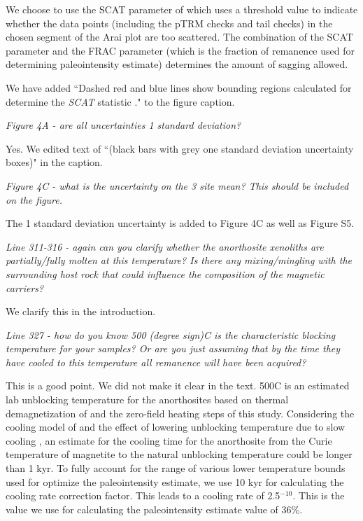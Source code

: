 \documentclass[11pt, letterpaper]{article}
\begin{document}
\begin{flushleft}
We choose to use the SCAT parameter of \cite{Tauxe2004a} which uses a threshold value to indicate whether the data points (including the pTRM checks and tail checks) in the chosen segment of the Arai plot are too scattered. The combination of the SCAT parameter and the FRAC parameter (which is the fraction of remanence used for determining paleointensity estimate) determines the amount of sagging allowed.

We have added ``Dashed red and blue lines show bounding regions calculated for determine the \textit{SCAT} statistic \cite{Shaar2013a}." to the figure caption.

\textit{Figure 4A - are all uncertainties 1 standard deviation?}

Yes. We edited text of ``(black bars with grey one standard deviation uncertainty boxes)" in the caption.

\textit{Figure 4C - what is the uncertainty on the 3 site mean? This should be included on the figure.}

The 1 standard deviation uncertainty is added to Figure 4C as well as Figure S5.

\textit{Line 311-316 - again can you clarify whether the anorthosite xenoliths are partially/fully molten at this temperature? Is there any mixing/mingling with the surrounding host rock that could influence the composition of the magnetic carriers?}

We clarify this in the introduction.  

\textit{Line 327 - how do you know 500 (degree sign)C is the characteristic blocking temperature for your samples? Or are you just assuming that by the time they have cooled to this temperature all remanence will have been acquired?}

This is a good point. We did not make it clear in the text. 500\textdegree C is an estimated lab unblocking temperature for the anorthosites based on thermal demagnetization of \cite{Zhang2021b} and the zero-field heating steps of this study. Considering the cooling model of \cite{Zhang2021a} and the effect of lowering unblocking temperature due to slow cooling \cite{Pullaiah1975a}, an estimate for the cooling time for the anorthosite from the Curie temperature of magnetite to the natural unblocking temperature could be longer than 1 kyr. To fully account for the range of various lower temperature bounds used for optimize the paleointensity estimate, we use 10 kyr for calculating the cooling rate correction factor. This leads to a cooling rate of 2.5$^{-10}$. This is the value we use for calculating the paleointensity estimate value of 36\%. 


\end{flushleft}
\end{document}
